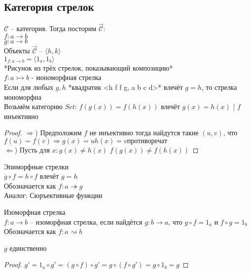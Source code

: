 \subsection{Категория стрелок}
$\mathcal{C}$ -- категория. Тогда посторим $\overrightarrow{\mathcal{C}}$: \\
$f\colon a \to b$ \\
$g\colon a \to b$ \\

Объекты $\overrightarrow{\mathcal{C}}$ -- $\langle h, k \rangle$ \\
$1_{f\colon a \to b} = \langle 1_a, 1_b \rangle$ \\

*Рисунок из трёх стрелок, показывающий композицию* \\

$f\colon a \rightarrowtail b$ - мономорфная стрелка \\
Если для любых $g, h$ *квадратик <h f f g, a b c d>* влечёт $g = h$, то стрелка
мономорфна \\

Возьмём категорию $Set$: $f(g(x)) = f(h(x))$ влечёт $g(x)=h(x)$ | $f$ инъективно
\begin{proof}
  $\Rightarrow$) Предположим $f$ не инъективно тогда найдутся такие $(u, v)$, что $f(u) = f(v)
  \Rightarrow g(x) = u h(x) = v противоречат$ \\
  $\Leftarrow$) Пусть для $x: g(x) \ne h(x)$ $f(g(x)) \ne f(h(x))$
\end{proof}

Эпиморфные стрелки \\
$g \circ f = h \circ f$ влечёт $g = h$ \\
Обозначается как $f\colon a \twoheadrightarrow g$ \\
Аналог: Сюръективные функции

Изоморфная стрелка \\
$f\colon a \to b$ -- изоморфная стрелка, если найдётся $g\colon b \to a$, что
$g \circ f = 1_a$ и $f \circ g = 1_b$ \\
Обозначается как $f\colon a \rightsquigarrow b$ \\
\begin{stmt}
  $g$ единственно
\end{stmt}
\begin{proof}
  $g' = 1_a \circ g' = (g \circ f) \circ g' = g \circ (f \circ g') = g \circ 1_b = g$
\end{proof}

